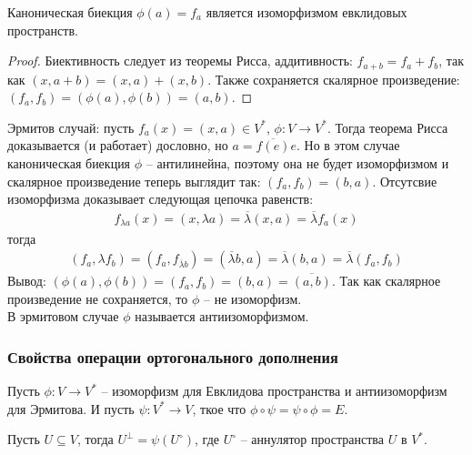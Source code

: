 \begin{theorem}
    Каноническая биекция $\phi(a) = f_a$ является изоморфизмом евклидовых пространств.
\end{theorem}

\begin{proof}
    Биективность следует из теоремы Рисса, аддитивность: $f_{a + b} = f_a + f_b$, так как $(x, a + b) = (x, a) + (x, b)$. Также сохраняется скалярное произведение: $(f_a, f_b) = (\phi(a), \phi(b)) = (a, b)$.
\end{proof}

\begin{note}
    Эрмитов случай: пусть $f_a(x) = (x, a) \in V^*$, $\phi: V \to V^*$. Тогда теорема Рисса доказывается (и работает) дословно, но $a = \overline{f(e)} e$. Но в этом случае каноническая биекция $\phi$ -- антилинейна, поэтому она не будет изоморфизмом и скалярное произведение теперь выглядит так: $(f_a, f_b) = (b, a)$. Отсутсвие изоморфизма доказывает следующая цепочка равенств:
    \begin{gather*}
        f_{\lambda a}(x) = (x, \lambda a) = \overline{\lambda} (x, a) = \overline{\lambda} f_a(x)
    \end{gather*}
    тогда 
    \begin{gather*}
        (f_a, \lambda f_b) = (f_a, f_{\overline{\lambda} b}) = (\overline{\lambda} b, a) = \overline{\lambda}(b, a) = \overline{\lambda} (f_a, f_b)
    \end{gather*}
    Вывод: $(\phi(a), \phi(b)) = (f_a, f_b) = (b, a) = \overline{(a, b)}$. Так как скалярное произведение не сохраняется, то $\phi$ -- не изоморфизм. \\
    В эрмитовом случае $\phi$ называется антиизоморфизмом.
\end{note}

\subsubsection{Свойства операции ортогонального дополнения}
Пусть $\phi: V \to V^*$ -- изоморфизм для Евклидова пространства и антиизоморфизм для Эрмитова. И пусть $\psi: V^* \to V$, ткое что $\phi \circ \psi = \psi \circ \phi = E$.

\begin{proposition}
\label{pr 12.2}
    Пусть $U \subseteq V$, тогда $U^{\perp} = \psi (U^{\circ})$, где $U^{\circ}$ -- аннулятор пространства $U$ в $V^*$.
\end{proposition}

